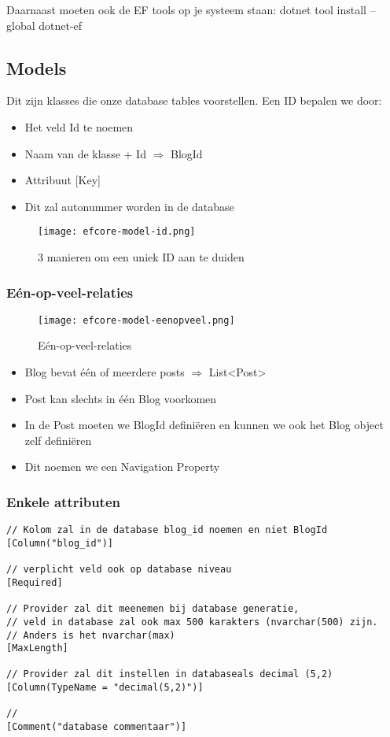 \documentclass{article}
\begin{document}
Daarnaast moeten ook de EF tools op je systeem staan: dotnet tool install --global dotnet-ef

\subsection{Models}

Dit zijn klasses die onze database tables voorstellen. Een ID bepalen we door:

\begin{itemize}
    \item Het veld Id te noemen
    \item Naam van de klasse + Id $\Rightarrow$ BlogId
    \item Attribuut [Key]
    \item Dit zal autonummer worden in de database
\end{itemize}

\begin{figure}[H]
    \centering
    \texttt{[image: efcore-model-id.png]}
    \caption{3 manieren om een uniek ID aan te duiden}
\end{figure}

\subsubsection{Eén-op-veel-relaties}

\begin{figure}[H]
    \centering
    \texttt{[image: efcore-model-eenopveel.png]}
    \caption{Eén-op-veel-relaties}
\end{figure}


\begin{itemize}
    \item Blog bevat één of meerdere posts $\Rightarrow$ List<Post>
    \item Post kan slechts in één Blog voorkomen
    \item In de Post moeten we BlogId definiëren en kunnen we ook het Blog object zelf definiëren
    \item Dit noemen we een Navigation Property
\end{itemize}

\subsubsection{Enkele attributen}

\begin{verbatim}
// Kolom zal in de database blog_id noemen en niet BlogId
[Column("blog_id")] 

// verplicht veld ook op database niveau
[Required]

// Provider zal dit meenemen bij database generatie, 
// veld in database zal ook max 500 karakters (nvarchar(500) zijn. 
// Anders is het nvarchar(max)
[MaxLength]  

// Provider zal dit instellen in databaseals decimal (5,2)
[Column(TypeName = "decimal(5,2)")]  

//
[Comment("database commentaar")]  
\end{verbatim}
\end{document}
